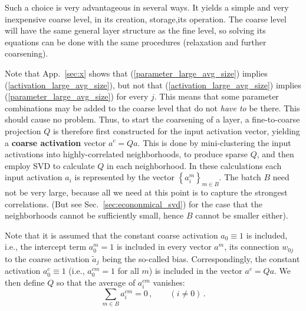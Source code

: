\documentclass{article} %
\begin{document}
Such a choice is very advantageous in several ways. It yields a simple and very inexpensive coarse level, in its creation, storage,its operation. The coarse level will have the same general layer structure as the fine level, so solving its equations can be done with the same procedures (relaxation and further coarsening).

Note that App.~\ref{sec:x} shows that (\ref{parameter_large_avg_size}) implies (\ref{activation_large_avg_size}), but not that (\ref{activation_large_avg_size}) implies (\ref{parameter_large_avg_size}) for every $j$. This means that some parameter combinations may be added to the coarse level that do not {\it have to} be there. This should cause no problem. Thus, to start the coarsening of a layer, a fine-to-coarse projection $Q$ is therefore first constructed for the input activation vector, yielding a \textbf{coarse activation} vector $a^c = Qa$. This is done by mini-clustering the input activations into highly-correlated neighborhoods, to produce sparse $Q$, and then employ SVD to calculate $Q$ in each neighborhood. In these calculations each input activation $a_i$ is represented by the vector $\left\{ a^m_i \right\}_{m \in B}$. The batch $B$ need not be very large, because all we need at this point is to capture the strongest correlations. (But see Sec.~\ref{sec:econonmical_svd}) for the case that the neighborhoods cannot be sufficiently small, hence $B$ cannot be smaller either). 

Note that it is assumed that the constant coarse activation $a_0 \equiv 1$ is included, i.e., the intercept term $a_0^m = 1$ is included in every vector $a^m$, its connection $w_{0j}$ to the coarse activation $\tilde{a}_j$ being the so-called bias. Correspondingly, the constant activation $a_0^c \equiv 1$ (i.e., $a_0^{cm} = 1$ for all $m$) is included in the vector $a^c = Q a$. We then define $Q$ so that the average of $a_i^{cm}$ vanishes:
$$
    \sum_{m \in B} a_i^{cm} = 0\,,\qquad (i \not = 0)\,.
$$
\end{document}
